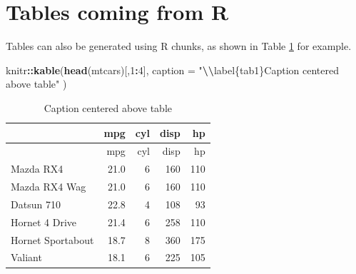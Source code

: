 \documentclass[preprint, 3p,
authoryear]{elsarticle} %
\newenvironment{Shaded}{\begin{snugshade}}{\end{snugshade}}
\newcommand{\AttributeTok}[1]{\textcolor[rgb]{0.13,0.29,0.53}{#1}}
\newcommand{\DecValTok}[1]{\textcolor[rgb]{0.00,0.00,0.81}{#1}}
\newcommand{\FunctionTok}[1]{\textcolor[rgb]{0.13,0.29,0.53}{\textbf{#1}}}
\newcommand{\NormalTok}[1]{#1}
\newcommand{\SpecialCharTok}[1]{\textcolor[rgb]{0.81,0.36,0.00}{\textbf{#1}}}
\newcommand{\StringTok}[1]{\textcolor[rgb]{0.31,0.60,0.02}{#1}}
\begin{document}
\section{Tables coming from R}\label{tables-coming-from-r}

Tables can also be generated using R chunks, as shown in Table
\ref{tab1} for example.

\begin{Shaded}
\begin{Highlighting}[]
\NormalTok{knitr}\SpecialCharTok{::}\FunctionTok{kable}\NormalTok{(}\FunctionTok{head}\NormalTok{(mtcars)[,}\DecValTok{1}\SpecialCharTok{:}\DecValTok{4}\NormalTok{], }
    \AttributeTok{caption =} \StringTok{"}\SpecialCharTok{\textbackslash{}\textbackslash{}}\StringTok{label\{tab1\}Caption centered above table"}
\NormalTok{)}
\end{Highlighting}
\end{Shaded}

\begin{longtable}[]{@{}lrrrr@{}}
\caption{\label{tab1}Caption centered above table}\tabularnewline
\toprule\noalign{}
& mpg & cyl & disp & hp \\
\midrule\noalign{}
\endfirsthead
\toprule\noalign{}
& mpg & cyl & disp & hp \\
\midrule\noalign{}
\endhead
\bottomrule\noalign{}
\endlastfoot
Mazda RX4 & 21.0 & 6 & 160 & 110 \\
Mazda RX4 Wag & 21.0 & 6 & 160 & 110 \\
Datsun 710 & 22.8 & 4 & 108 & 93 \\
Hornet 4 Drive & 21.4 & 6 & 258 & 110 \\
Hornet Sportabout & 18.7 & 8 & 360 & 175 \\
Valiant & 18.1 & 6 & 225 & 105 \\
\end{longtable}

\renewcommand\refname{References}

\end{document}
